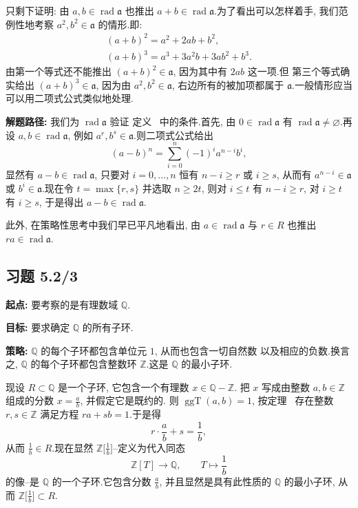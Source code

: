 只剩下证明: 由 $a, b \in \operatorname{rad} \mathfrak{a}$ 也推出 $a + b \in
\operatorname{rad} \mathfrak{a}$.为了看出可以怎样着手, 我们范例性地考察
$a^2, b^2 \in \mathfrak{a}$ 的情形.即:
\[
\begin{array}{l}
(a + b)^2 = a^2 + 2ab + b^2, \\
(a + b)^3 = a^3 + 3a^2b + 3ab^2 + b^3\text{.}
\end{array}
\]
由第一个等式还不能推出 $(a + b)^2 \in \mathfrak{a}$, 因为其中有 $2ab$ 这一项.但
第三个等式确实给出 $(a + b)^3 \in \mathfrak{a}$, 因为由 $a^2, b^2 \in \mathfrak{a}$,
右边所有的被加项都属于 $\mathfrak{a}$.一般情形应当可以用二项式公式类似地处理.

\noindent\textbf{解题路径:} 我们为 $\operatorname{rad} \mathfrak{a}$ 验证
定义~ 中的条件.首先, 由 $0 \in \operatorname{rad} \mathfrak{a}$ 有
$\operatorname{rad} \mathfrak{a} \neq \varnothing$.再设 $a, b \in \operatorname{rad}
\mathfrak{a}$, 例如 $a^r, b^s \in \mathfrak{a}$.则二项式公式给出
\[
(a - b)^n = \sum_{i = 0}^{n} (-1)^i a^{n - i} b^i,
\]
显然有 $a - b \in \operatorname{rad} \mathfrak{a}$, 只要对 $i = 0, \ldots, n$ 恒有
$n - i \geq r$ 或 $i \geq s$, 从而有 $a^{n - i} \in \mathfrak{a}$ 或
$b^i \in \mathfrak{a}$.现在令 $t = \max \{ r, s \}$ 并选取 $n \geq 2t$, 则对
$i \leq t$ 有 $n - i \geq r$, 对 $i \geq t$ 有 $i \geq s$, 于是得出 $a - b \in
\operatorname{rad} \mathfrak{a}$.

此外, 在策略性思考中我们早已平凡地看出, 由 $a \in \operatorname{rad} \mathfrak{a}$
与 $r \in R$ 也推出 $ra \in \operatorname{rad} \mathfrak{a}$.

\subsection*{习题 5.2/3}

\noindent\textbf{起点:} 要考察的是有理数域 $\mathbb{Q}$.

\noindent\textbf{目标:} 要求确定 $\mathbb{Q}$ 的所有子环.

\noindent\textbf{策略:} $\mathbb{Q}$ 的每个子环都包含单位元 $1$, 从而也包含一切自然数
以及相应的负数.换言之, $\mathbb{Q}$ 的每个子环都包含整数环 $\mathbb{Z}$.这是
$\mathbb{Q}$ 的最小子环.

现设 $R \subset \mathbb{Q}$ 是一个子环, 它包含一个有理数 $x \in \mathbb{Q} - \mathbb{Z}$.
把 $x$ 写成由整数 $a, b \in \mathbb{Z}$ 组成的分数 $x = \frac{a}{b}$, 并假定它是既约的.
则 $\operatorname{ggT}(a, b) = 1$, 按定理~ 存在整数 $r, s \in \mathbb{Z}$
满足方程 $ra + sb = 1$.于是得
\[
r \cdot \frac{a}{b} + s = \frac{1}{b},
\]
从而 $\frac{1}{b} \in R$.现在显然 $\mathbb{Z}\bigl[ \frac{1}{b} \bigr]$--定义为代入同态
\[
\mathbb{Z}[T] \longrightarrow \mathbb{Q}, \qquad T \longmapsto \frac{1}{b}
\]
的像--是 $\mathbb{Q}$ 的一个子环.它包含分数 $\frac{a}{b}$, 并且显然是具有此性质的
$\mathbb{Q}$ 的最小子环, 从而 $\mathbb{Z}\bigl[ \frac{1}{b} \bigr] \subset R$.

